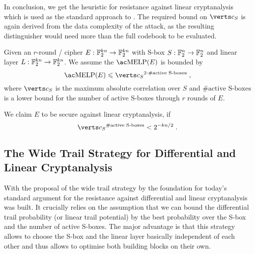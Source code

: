 In conclusion, we get the heuristic for resistance against linear cryptanalysis which is used as the standard approach to .
The required bound on $\abs{c_S}$ is again derived from the data complexity of the attack, as the resulting distinguisher would need more than the full codebook to be evaluated.
\begin{heuristic}\label{heu:lc}
    Given an $r$-round \SPN/ cipher $E : \mathbb{F}_2^{kn} \to \mathbb{F}_2^{kn}$ with S-box $S : \mathbb{F}_2^n \to \mathbb{F}_2^n$ and linear layer $L : \mathbb{F}_2^{kn} \to \mathbb{F}_2^{kn}$.
    We assume the $\mathrm{\MELP/}(E)$ is bounded by
    \begin{equation*}
        \mathrm{\MELP/}(E) \leqslant \abs{c_S}^{2 \cdot \text{\#active S-boxes}}\;,
    \end{equation*}
    where $\abs{c_S}$ is the maximum absolute correlation over $S$ and $\text{\#active S-boxes}$ is a lower bound for the number of active S-boxes through $r$ rounds of $E$.

    We claim $E$ to be secure against linear cryptanalysis, if
    \begin{equation*}
        \abs{c_S}^{\text{\#active S-boxes}} < 2^{-kn/2}\;.
    \end{equation*}
\end{heuristic}

\subsection{The Wide Trail Strategy for Differential and Linear Cryptanalysis}\label{sec:prelim:practical-sec}
With the proposal of the wide trail strategy by \textcite{PhD:Daemen95} the foundation for today's standard argument for the resistance against differential and linear cryptanalysis was built.
It crucially relies on the assumption that we can bound the differential trail probability (or linear trail potential) by the best probability over the S-box and the number of active S-boxes.
The major advantage is that this strategy allows to choose the S-box and the linear layer basically independent of each other and thus allows to optimise both building blocks on their own.

